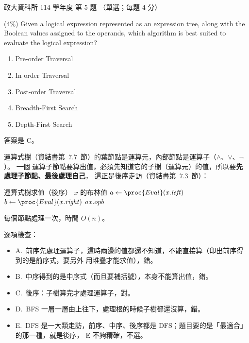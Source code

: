 \begin{pastexam}[label={px:nccu-114-dsa-05}]{政大資科所 114 學年度 第 5 題}
（單選；每題 4 分）

(4\%) Given a logical expression represented as an expression tree, along with the Boolean values
assigned to the operands, which algorithm is best suited to evaluate the logical expression?
\begin{enumerate}[label=\Alph*.]
\item Pre-order Traversal
\item In-order Traversal
\item Post-order Traversal
\item Breadth-First Search
\item Depth-First Search
\end{enumerate}
\end{pastexam}

\begin{pastsoln}
答案是 C。

運算式樹（資結書第~7.7~節）的葉節點是運算元，內部節點是運算子（$\wedge$、$\vee$、$\neg$）。 一個
運算子節點要算出值，必須先知道它的子樹（運算元）的值，所以要\textbf{先處理子節點、最後處理自己}，
這正是後序走訪（資結書第~7.3~節）：
\begin{pseudo}[unbreakable]{運算式樹求值（後序）}
        \State \Return $x$ 的布林值
    \EndIf
    \State $a \gets \proc{Eval}(x.\mathit{left})$ 
    \State $b \gets \proc{Eval}(x.\mathit{right})$
    \State \Return $a \mathbin{x.\mathit{op}} b$
\EndFunction
\end{pseudo}
每個節點處理一次，時間 $O(n)$。

逐項檢查：
\begin{itemize}
\item A.~前序先處理運算子，這時兩邊的值都還不知道，不能直接算（印出前序得到的是前序式，要另外
用堆疊才能求值），錯。
\item B.~中序得到的是中序式（而且要補括號），本身不能算出值，錯。
\item C.~後序：子樹算完才處理運算子，對。
\item D.~BFS 一層一層由上往下，處理根的時候子樹都還沒算，錯。
\item E.~DFS 是一大類走訪，前序、中序、後序都是 DFS；題目要的是「最適合」的那一種，就是後序，
E 不夠精確，不選。
\end{itemize}
\end{pastsoln}
